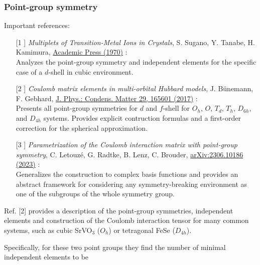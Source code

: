 \documentclass[12pt,a4paper]{scrartcl}
\numberwithin{equation}{section}
\begin{document}
\subsubsection{Point-group symmetry}
Important references:
\begin{itemize}
 \item[[1]] \textit{Multiplets of Transition-Metal Ions in Crystals}, S. Sugano, Y. Tanabe, H. Kamimura, \href{https://shop.elsevier.com/books/multiplets-of-transition-metal-ions-in-crystals/sugano/978-0-12-676050-7}{Academic Press (1970)} :\\
 Analyzes the point-group symmetry and independent elements for the specific case of a $d$-shell in cubic environment.
 
\item[[2]] \textit{Coulomb matrix elements in multi-orbital Hubbard models}, J. B\"unemann, F. Gebhard, \href{https://doi.org/10.1088/1361-648X/aa5900}{J. Phys.: Condens. Matter 29, 165601 (2017)} : \\
Presents all point-group symmetries for $d$ and $f$-shell for $O_h$, $O$, $T_d$, $T_h$, $D_{6h}$, and $D_{4h}$ systems.
Provides explicit contruction formulas and a first-order correction for the spherical approximation.

\item[[3]] \textit{Parametrization of the Coulomb interaction matrix with point-group symmetry}, C. Letouz\'{e}, G. Radtke, B. Lenz, C. Brouder, \href{https://arxiv.org/abs/2306.10186v1}{arXiv:2306.10186 (2023)} : \\
Generalizes the construction to complex basis functions and provides an abstract framework for considering any symmetry-breaking environment as one of the subgroups of the whole symmetry group.
\end{itemize}

Ref. [2] provides a description of the point-group symmetries, independent elements and construction
of the Coulomb interaction tensor for many common systems, such as cubic SrVO$_3$ ($O_h$) or tetragonal
FeSe ($D_{4h}$).

Specifically, for these two point groups they find the number of minimal independent elements to be

\bigskip
\end{document}
